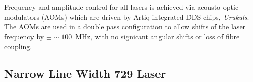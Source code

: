     Frequency and amplitude control for all lasers is achieved via acousto-optic modulators (AOMs) which are driven by Artiq integrated DDS chips, \emph{Urukuls}. The AOMs are used in a double pass configuration to allow shifts of the laser frequency by $\pm \sim 100$~MHz, with no signicant angular shifts or loss of fibre coupling. 
    
    
\subsection{Narrow Line Width 729 Laser}
\label{sec:Narrow Line Width 729 Laser} 

